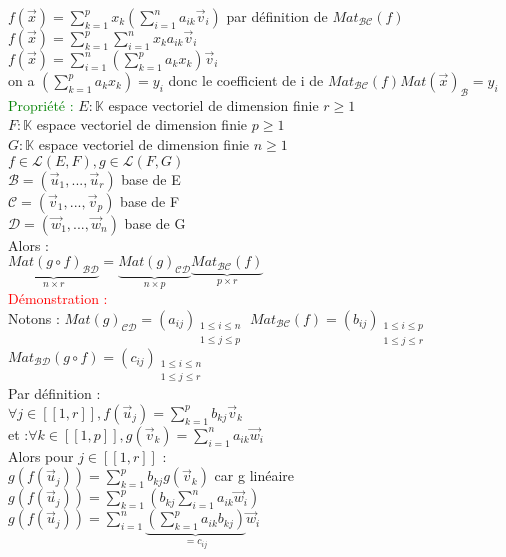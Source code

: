 \documentclass{article}
\begin{document}
        $f(\vec x)= \sum_{k=1}^p x_k (\sum_{i=1}^n a_{ik} \vec v_i)$ par définition de $Mat_{\mathcal{BC}}(f)$  \\
        $f(\vec x)= \sum_{k=1}^p \sum_{i=1}^n x_k a_{ik} \vec v_i$ \\
        $f(\vec x)= \sum_{i=1}^n (\sum_{k=1}^p a_k x_k) \vec v_i$ \\
        on a $(\sum_{k=1}^p a_k x_k)=y_i$ donc le coefficient de i de $Mat_{\mathcal{BC}} (f) Mat(\vec x)_{\mathcal B}=y_i$ \\
        \textcolor{green}{Propriété :} $E: \mathbb K$ espace vectoriel de dimension finie $r \geq 1$ \\
        $F: \mathbb K$ espace vectoriel de dimension finie $p \geq 1$ \\
        $G: \mathbb K$ espace vectoriel de dimension finie $n \geq 1$ \\
        $f \in \mathcal L(E,F), g \in \mathcal L(F,G)$ \\
        $\mathcal B =( \vec u_1,..., \vec u_r) $ base de E \\
        $\mathcal C =( \vec v_1,..., \vec v_p) $ base de F \\
        $\mathcal D =( \vec w_1,..., \vec w_n) $ base de G \\
        Alors : \\
        $\underbrace{Mat(g \circ f)_{\mathcal{BD}}}_{n \times r}=\underbrace{Mat(g)_{\mathcal{CD}}}_{n \times p} \underbrace{Mat_{\mathcal{BC}}(f)}_{p \times r}$ \\
        \textcolor{red}{Démonstration :} \\
        Notons : $Mat(g)_{\mathcal{CD}}=(a_{ij}){}_{\substack{1\leq i\leq n \\ 1\leq j\leq p}}$
        $Mat_{\mathcal{BC}}(f)=(b_{ij}){}_{\substack{1\leq i\leq p \\ 1\leq j\leq r}}$ \\ 
        $Mat_{\mathcal{BD}}(g \circ f)=(c_{ij}){}_{\substack{1\leq i\leq n \\ 1\leq j\leq r}}$  \\
        Par définition : \\
        $\forall j \in [[1,r]], f(\vec u_j)=\sum_{k=1}^p b_{kj} \vec v_k$\\
        et :$\forall k \in [[1,p]], g(\vec v_k)=\sum_{i=1}^n a_{ik} \vec w_i$ \\
        Alors pour $j \in [[ 1,r ]] $ : \\
        $g(f(\vec u_j))= \sum_{k=1}^p b_{kj} g(\vec v_k)$ car g linéaire \\
        $g(f(\vec u_j))=\sum_{k=1}^p(b_{kj}\sum_{i=1}^n a_{ik} \vec w_i)$ \\
        $g(f(\vec u_j))=\sum_{i=1}^n\underbrace{(\sum_{k=1}^p a_{ik} b_{kj})}_{=c_{ij}} \vec w_i$ \\
\end{document}
